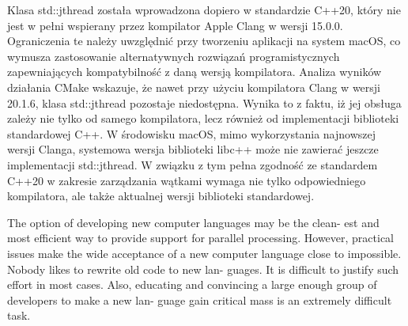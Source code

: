 Klasa std::jthread została wprowadzona dopiero w standardzie C++20, który nie jest w pełni wspierany przez kompilator Apple Clang w wersji 15.0.0. Ograniczenia te należy uwzględnić przy tworzeniu aplikacji na system macOS, co wymusza zastosowanie alternatywnych rozwiązań programistycznych zapewniających kompatybilność z daną wersją kompilatora. Analiza wyników działania CMake wskazuje, że nawet przy użyciu kompilatora Clang w wersji 20.1.6, klasa std::jthread pozostaje niedostępna. Wynika to z faktu, iż jej obsługa zależy nie tylko od samego kompilatora, lecz również od implementacji biblioteki standardowej C++. W środowisku macOS, mimo wykorzystania najnowszej wersji Clanga, systemowa wersja biblioteki libc++ może nie zawierać jeszcze implementacji std::jthread. W związku z tym pełna zgodność ze standardem C++20 w zakresie zarządzania wątkami wymaga nie tylko odpowiedniego kompilatora, ale także aktualnej wersji biblioteki standardowej.



The option of developing new computer languages may be the clean- est and most efficient way to provide support for parallel processing. However, practical issues make the wide acceptance of a new computer language close to impossible. Nobody likes to rewrite old code to new lan- guages. It is difficult to justify such effort in most cases. Also, educating and convincing a large enough group of developers to make a new lan- guage gain critical mass is an extremely difficult task.